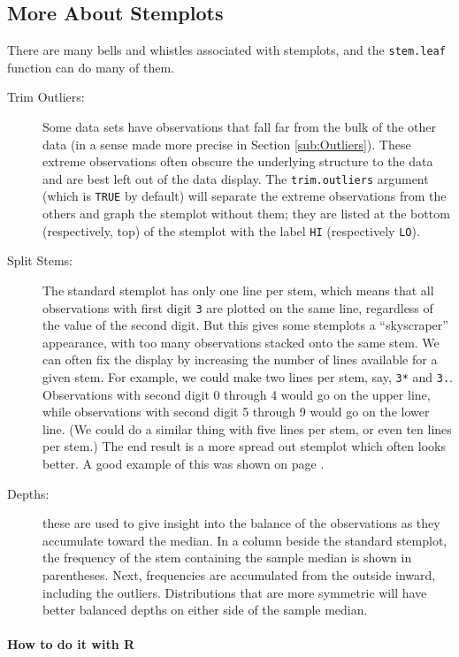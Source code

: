\documentclass[captions=tableheading]{scrbook}
\begin{document}
\subsection{More About Stemplots}
\label{sec-3-4-1}


There are many bells and whistles associated with stemplots, and the \texttt{stem.leaf} function can do many of them.

\begin{description}
\item[Trim Outliers:] Some data sets have observations that fall far from the bulk of the other data (in a sense made more precise in Section \ref{sub:Outliers}). These extreme observations often obscure the underlying structure to the data and are best left out of the data display. The \texttt{trim.outliers} argument (which is \texttt{TRUE} by default) will separate the extreme observations from the others and graph the stemplot without them; they are listed at the bottom (respectively, top) of the stemplot with the label \texttt{HI} (respectively \texttt{LO}).
\item[Split Stems:] The standard stemplot has only one line per stem, which means that all observations with first digit \texttt{3} are plotted on the same line, regardless of the value of the second digit. But this gives some stemplots a ``skyscraper'' appearance, with too many observations stacked onto the same stem. We can often fix the display by increasing the number of lines available for a given stem. For example, we could make two lines per stem, say, \texttt{3*} and \texttt{3.}. Observations with second digit 0 through 4 would go on the upper line, while observations with second digit 5 through 9 would go on the lower line. (We could do a similar thing with five lines per stem, or even ten lines per stem.) The end result is a more spread out stemplot which often looks better. A good example of this was shown on page \pageref{exa:stemleaf-multiple-lines-stem}.
\item[Depths:] these are used to give insight into the balance of the observations as they accumulate toward the median. In a column beside the standard stemplot, the frequency of the stem containing the sample median is shown in parentheses. Next, frequencies are accumulated from the outside inward, including the outliers. Distributions that are more symmetric will have better balanced depths on either side of the sample median.
\end{description}


\paragraph*{How to do it with \textsf{R}}
\end{document}
